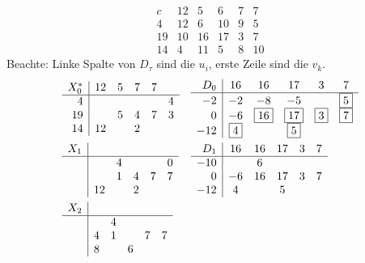 \begin{exmp} %
  \[
    \begin{array}{r|ccccc}
      c & 12 & 5 & 6 & 7 & 7 \\
      \hline
      4 & 12 & 6 & 10 & 9 & 5 \\
      19 & 10 & 16 & 17 & 3 & 7 \\
      14 & 4 & 11 & 5 & 8 & 10
    \end{array}
  \]
  Beachte: Linke Spalte von $D_\tau$ sind die $u_i$, erste Zeile sind die $v_k$.
  \begin{align*}
    &\begin{array}{r|ccccc}
      X_0^* & 12 & 5 & 7 & 7 \\
      \hline
      4 &  &  &  &  & 4 \\
      19 &  & 5 & 4 & 7 & 3 \\
      14 & 12 & & 2 
    \end{array}
                     &
    &\begin{array}{r|ccccc}
      D_0 & 16 & 16 & 17 & 3 & 7 \\
      \hline
       -2 & -2 & -8 & -5 & & \boxed{5} \\
       0 & -6 & \boxed{16} & \boxed{17} & \boxed{3} & \boxed{7}  \\
       -12 & \boxed{4} & & \boxed{5} 
    \end{array} \\
    &\begin{array}{r|ccccc}
      X_1 &  \\
      \hline
       & & 4 & & & 0 \\
       & & 1 & 4 & 7 & 7 \\
       & 12 & & 2 & &
    \end{array}
                      &
    &\begin{array}{r|ccccc}
      D_1 & 16 & 16 & 17 & 3 & 7  \\
      \hline
      -10 & & 6 & & & \\
      0 & -6 & 16 & 17 & 3 & 7 \\
      -12 & 4 & & 5 & &
     \end{array}\\
    &\begin{array}{r|ccccc}
      X_2 &  \\
      \hline
       & & 4 & & & \\
       & 4 & 1 & & 7 & 7 \\
       & 8 & & 6 & &
    \end{array}

\end{align*}
\end{exmp}
